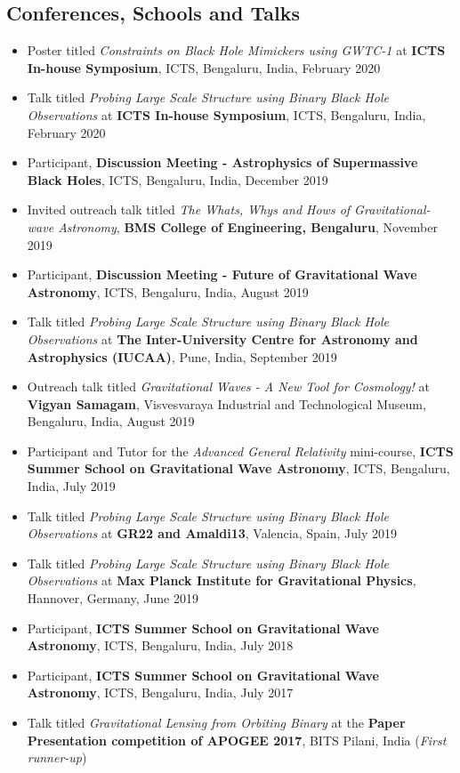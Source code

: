 \documentclass[margin, centered]{res}
\begin{document}
\begin{resume}
\section{Conferences, Schools and Talks}
\begin{itemize}[leftmargin=*]
 \item Poster titled \textit{Constraints on Black Hole Mimickers using GWTC-1} at \textbf{ICTS In-house Symposium}, ICTS, Bengaluru, India, February 2020
 \item Talk titled \textit{Probing Large Scale Structure using Binary Black Hole Observations} at \textbf{ICTS In-house Symposium}, ICTS, Bengaluru, India, February 2020
 \item	Participant, \textbf{Discussion Meeting - Astrophysics of Supermassive Black Holes}, ICTS, Bengaluru, India, December 2019
 \item Invited outreach talk titled \textit{The Whats, Whys and Hows of Gravitational-wave Astronomy}, \textbf{BMS College of Engineering, Bengaluru}, November 2019
 \item Participant, \textbf{Discussion Meeting - Future of Gravitational Wave Astronomy}, ICTS, Bengaluru, India, August 2019
 \item Talk titled \textit{Probing Large Scale Structure using Binary Black Hole Observations} at \textbf{The Inter-University Centre for Astronomy and Astrophysics (IUCAA)}, Pune, India, September 2019
 \item Outreach talk titled \textit{Gravitational Waves - A New Tool for Cosmology!} at \textbf{Vigyan Samagam}, Visvesvaraya Industrial and Technological Museum, Bengaluru, India, August 2019
 \item Participant and Tutor for the \textit{Advanced General Relativity} mini-course, \textbf{ICTS Summer School on Gravitational Wave Astronomy}, ICTS, Bengaluru, India, July 2019
 \item Talk titled \textit{Probing Large Scale Structure using Binary Black Hole Observations} at \textbf{GR22 and Amaldi13}, Valencia, Spain, July 2019
 \item Talk titled \textit{Probing Large Scale Structure using Binary Black Hole Observations} at \textbf{Max Planck Institute for Gravitational Physics}, Hannover, Germany, June 2019
 \item Participant, \textbf{ICTS Summer School on Gravitational Wave Astronomy}, ICTS, Bengaluru, India, July 2018
 \item Participant, \textbf{ICTS Summer School on Gravitational Wave Astronomy}, ICTS, Bengaluru, India, July 2017
 \item Talk titled \textit{Gravitational Lensing from Orbiting Binary} at the \textbf{Paper Presentation competition of APOGEE 2017}, BITS Pilani, India (\textit{First runner-up})
 \end{itemize}

\end{resume}
\end{document}
